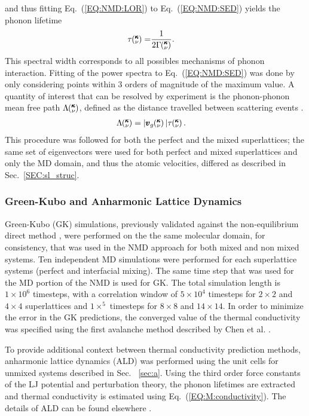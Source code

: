 \documentclass[aps,prb,preprint,preprintnumbers,amsmath,amssymb,floatfix,superscriptaddress]{revtex4}
\newcommand{\kv}{\mspace{-4.0mu}\left(\mspace{-8.0mu}
\begin{smallmatrix}&\pmb{\kappa} \\&\nu\end{smallmatrix}
\mspace{-3.0mu}\right)}
\begin{document}
and thus fitting Eq.~(\ref{EQ:NMD:LOR}) to Eq.~(\ref{EQ:NMD:SED}) yields the phonon lifetime
\begin{equation}\label{EQ:lifetime}
\begin{split}
\tau\kv=&\frac{1}{2\Gamma\kv}.
\end{split}
\end{equation}
This spectral width corresponds to all possibles mechanisms of phonon interaction. Fitting of the power spectra to Eq.~(\ref{EQ:NMD:SED}) was done by only considering points within 3 orders of magnitude of the maximum value. A quantity of interest that can be resolved by experiment\cite{Jon} is the phonon-phonon mean free path $\Lambda\kv$, defined as the distance travelled between scattering events \cite{ziman_electrons_2001}. 
\begin{equation}\label{EQ:M:phonon_mfp}
\begin{split}
\Lambda\kv &= |\pmb{v}_{g}\kv {}| \tau\kv.
\end{split}
\end{equation}
This procedure was followed for both the perfect and the mixed superlattices; the same set of eigenvectors were used for both perfect and mixed superlattices and only the MD domain, and thus the atomic velocities, differed as described in Sec.~\ref{SEC:sl_struc}.

\subsubsection{Green-Kubo and Anharmonic Lattice Dynamics}
Green-Kubo (GK) simulations, previously validated against the non-equilibrium direct method \cite {PhysRevB.79.075316}, were performed on the the same molecular domain, for consistency, that was used in the NMD approach for both mixed and non mixed systems. Ten independent MD simulations were performed for each superlattice systems (perfect and interfacial mixing). The same time step that was used for the MD portion of the NMD is used for GK. The total  simulation length is $1\times 10^6$ timesteps, with a correlation window of $5\times 10^4$ timesteps for $2 \times 2$ and $4 \times 4$ superlattices and $1\times ^5$ timesteps for $8 \times 8$ and $14 \times 14$. In order to minimize the error in the GK predictions, the converged value of the thermal conductivity was specified using the first avalanche method described by Chen et al. \cite{Chen20102392}.

To provide additional context between thermal conductivity prediction methods, anharmonic lattice dynamics (ALD) was performed using the unit cells for unmixed systems described in Sec. ~\ref{sec:a}. Using the third order force constants of the LJ potential and perturbation theory, the phonon lifetimes are extracted and thermal conductivity is estimated using Eq.~(\ref{EQ:M:conductivity}). The details of ALD can be found elsewhere \cite{PhysRevB.79.064301}.
\end{document}
